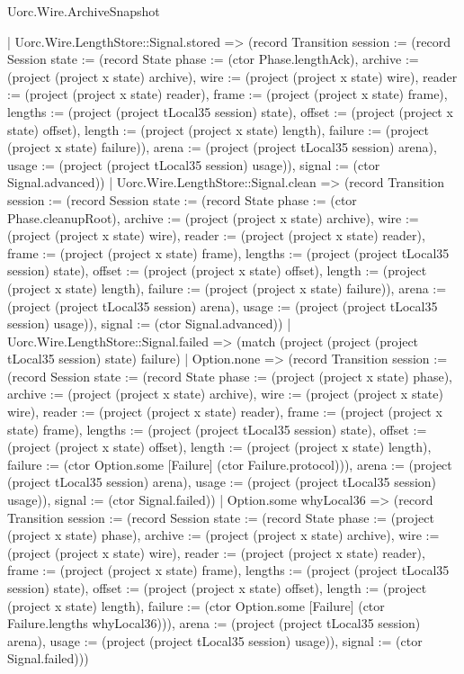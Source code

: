\begin{lexlean}{Uorc.Wire.ArchiveSnapshot}
\begin{semanticmodule}
{        | Uorc.Wire.LengthStore::Signal.stored => (record Transition {session := (record Session {state := (record State {phase := (ctor Phase.lengthAck), archive := (project (project x state) archive), wire := (project (project x state) wire), reader := (project (project x state) reader), frame := (project (project x state) frame), lengths := (project (project tLocal35 session) state), offset := (project (project x state) offset), length := (project (project x state) length), failure := (project (project x state) failure)}), arena := (project (project tLocal35 session) arena), usage := (project (project tLocal35 session) usage)}), signal := (ctor Signal.advanced)})
        | Uorc.Wire.LengthStore::Signal.clean => (record Transition {session := (record Session {state := (record State {phase := (ctor Phase.cleanupRoot), archive := (project (project x state) archive), wire := (project (project x state) wire), reader := (project (project x state) reader), frame := (project (project x state) frame), lengths := (project (project tLocal35 session) state), offset := (project (project x state) offset), length := (project (project x state) length), failure := (project (project x state) failure)}), arena := (project (project tLocal35 session) arena), usage := (project (project tLocal35 session) usage)}), signal := (ctor Signal.advanced)})
        | Uorc.Wire.LengthStore::Signal.failed => (match (project (project (project tLocal35 session) state) failure)
          | Option.none => (record Transition {session := (record Session {state := (record State {phase := (project (project x state) phase), archive := (project (project x state) archive), wire := (project (project x state) wire), reader := (project (project x state) reader), frame := (project (project x state) frame), lengths := (project (project tLocal35 session) state), offset := (project (project x state) offset), length := (project (project x state) length), failure := (ctor Option.some [Failure] (ctor Failure.protocol))}), arena := (project (project tLocal35 session) arena), usage := (project (project tLocal35 session) usage)}), signal := (ctor Signal.failed)})
          | Option.some whyLocal36 => (record Transition {session := (record Session {state := (record State {phase := (project (project x state) phase), archive := (project (project x state) archive), wire := (project (project x state) wire), reader := (project (project x state) reader), frame := (project (project x state) frame), lengths := (project (project tLocal35 session) state), offset := (project (project x state) offset), length := (project (project x state) length), failure := (ctor Option.some [Failure] (ctor Failure.lengths whyLocal36))}), arena := (project (project tLocal35 session) arena), usage := (project (project tLocal35 session) usage)}), signal := (ctor Signal.failed)}))
}
\end{semanticmodule}
\end{lexlean}
